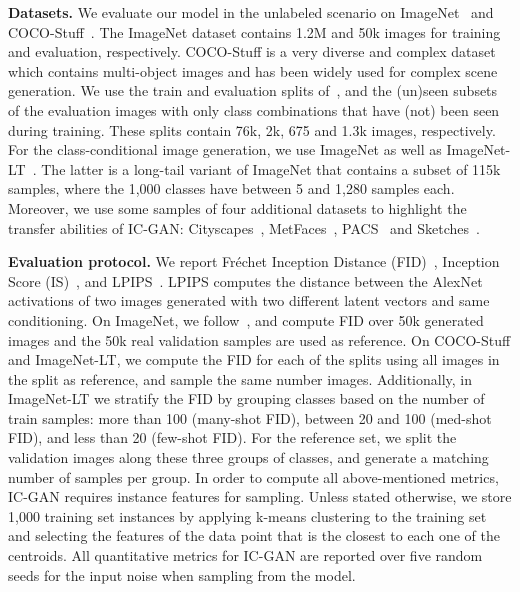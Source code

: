 \textbf{Datasets.} We evaluate our model in the unlabeled scenario on  ImageNet~\cite{ILSVRC15} and COCO-Stuff~\cite{caesar2018cvpr}. The ImageNet dataset contains 1.2M and 50k images for training and evaluation, respectively. COCO-Stuff is a very diverse and complex dataset which contains multi-object images and has been widely used for complex scene generation. We use the train and evaluation splits of~\cite{casanova2020generating}, and the (un)seen subsets of the evaluation images with only class combinations that have (not)  been seen during training. These splits contain 76k, 2k, 675 and 1.3k images, respectively. For the class-conditional image generation, we use ImageNet as well as ImageNet-LT~\cite{openlongtailrecognition}. The latter is a long-tail variant of  ImageNet that contains a subset of 115k samples, where the 1,000 classes have between 5 and 1,280  samples each. Moreover, we use some samples of four additional datasets to highlight the transfer abilities of {IC-GAN}: Cityscapes~\cite{Cordts2016Cityscapes}, MetFaces~\cite{karras2020training}, PACS~\cite{li2017deeper} and Sketches~\cite{eitz2012hdhso}.

\textbf{Evaluation protocol.} We report Fréchet Inception Distance (FID)~\cite{heusel17nips}, Inception Score (IS)~\cite{salimans16nips}, and  LPIPS~\cite{zhang2018perceptual}. LPIPS computes the distance between the AlexNet activations of two  images generated with two different latent vectors and same conditioning. On ImageNet, we follow~\cite{brock2018large}, and compute FID  over 50k generated images and the 50k real validation samples are used as reference. On COCO-Stuff and ImageNet-LT, we compute the FID for each of the splits using all images in the split as reference, and sample the same number images. Additionally, in ImageNet-LT we stratify the FID by grouping classes based on the number of train samples:  more than 100  (many-shot FID),  between 20 and 100  (med-shot FID), and  less than 20 (few-shot FID). For the reference set, we split the validation images along these three groups of classes, and generate a matching number of samples per group. In order to compute all above-mentioned metrics, {IC-GAN} requires instance features for sampling. Unless stated otherwise, we store 1,000 training set instances by applying  k-means clustering to the training set and selecting the features of the data point that is the closest to each one of the centroids. All quantitative metrics for {IC-GAN} are reported over five random seeds for the input noise when sampling from the model.

